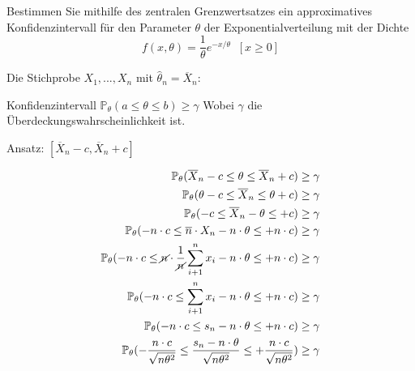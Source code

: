 \begin{uebsp}
\begin{Exercise}[label=ex:8.3]
Bestimmen Sie mithilfe des zentralen Grenzwertsatzes ein approximatives Konfidenzintervall für den Parameter $\theta$ der Exponentialverteilung mit der Dichte
\[f(x,\theta)=\frac{1}{\theta}e^{-x/\theta}\;\;[x\geq 0]\]
\end{Exercise}
\begin{Answer}
Die Stichprobe $X_1,...,X_n$ mit $\hat\theta_n=\overline X_n$:

\begin{uebsp_theory}
Konfidenzintervall $\mathbb P_\theta(a\leq\theta\leq b)\geq\gamma$
Wobei $\gamma$ die Überdeckungswahrscheinlichkeit ist.

Ansatz: $[\overline X_n-c,\overline X_n+c]$
\end{uebsp_theory}
\begin{eqnarray*}
\mathbb{P}_\theta(\overline X_n-c\leq\theta\leq\overline X_n+c)\geq\gamma\\
\mathbb{P}_\theta(\theta-c\leq\overline X_n\leq\theta+c)\geq\gamma\\
\mathbb{P}_\theta(-c\leq\overline X_n-\theta\leq+c)\geq\gamma\\
\mathbb{P}_\theta(-n\cdot c\leq\overline n\cdot X_n-n\cdot\theta\leq+n\cdot c)\geq\gamma\\
\mathbb{P}_\theta(-n\cdot c\leq \cancel n\cdot \frac{1}{\cancel n}\sum_{i+1}^nx_i-n\cdot\theta\leq+n\cdot c)\geq\gamma\\
\mathbb{P}_\theta(-n\cdot c\leq \sum_{i+1}^nx_i-n\cdot\theta\leq+n\cdot c)\geq\gamma\\
\mathbb{P}_\theta(-n\cdot c\leq s_n-n\cdot\theta\leq+n\cdot c)\geq\gamma\\
\mathbb{P}_\theta(-\frac{n\cdot c}{\sqrt{n\theta^2}}\leq \frac{s_n-n\cdot\theta}{\sqrt{n\theta^2}}\leq+\frac{n\cdot c}{\sqrt{n\theta^2}})\geq\gamma\\
\end{eqnarray*}


\end{Answer}
\end{uebsp}
